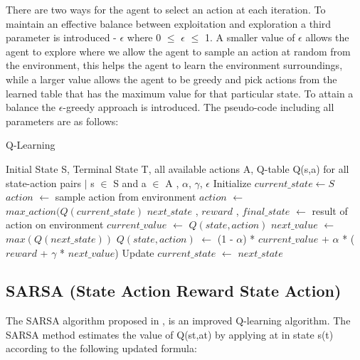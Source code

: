 \documentclass{svproc}
\begin{document}
There are two ways for the agent to select an action at each iteration. To maintain an effective balance between exploitation and exploration a third parameter is introduced - $\epsilon$ where 0 $\leq$  $\epsilon$ $\leq$ 1. A smaller value of $\epsilon$ allows the agent to explore where we allow the agent to sample an action at random from the environment, this helps the agent to learn the environment surroundings, while a larger value allows the agent to be greedy and pick actions from the learned table that has the maximum value for that particular state. 
To attain a balance the $\epsilon$-greedy approach is introduced. The pseudo-code including all parameters are as follows:

\begin{algorithm}
\caption{Q-Learning}
\begin{algorithmic}[1]
\REQUIRE Initial State S, Terminal State T, all available actions A, Q-table Q(s,a) for all state-action pairs $\mid$ s $\in$ S and a $\in$ A , $\alpha$, $\gamma$, $\epsilon$
\STATE Initialize $current\_state \leftarrow  S$
\REPEAT
{}
\STATE $action$ $\leftarrow$ sample action from environment
\ELSE
\STATE $action$ $\leftarrow$ $max\_action(Q(current\_state)$
\ENDIF
\STATE $next\_state$ , $reward$ , $final\_state$ $\leftarrow$ result of action on environment
\STATE $current\_value$ $\leftarrow$ $Q(state,action)$
\STATE $next\_value$ $\leftarrow$ $max(Q(next\_state))$
\STATE $Q(state,action)$ $\leftarrow$ (1 - $\alpha$) * $current\_value$ + $\alpha$ * ($reward$ + $\gamma$ * $next\_value$)
\STATE Update $current\_state$ $\leftarrow$ $next\_state$
\end{algorithmic}
\end{algorithm}

\subsection{SARSA (State Action Reward State Action)}
The SARSA algorithm proposed in \citep{sutton1996generalization,sutton1988learning}, is an improved Q-learning algorithm. The SARSA method estimates the value of Q(st,at) by applying at in state s(t) according to the following updated formula: \newline
\end{document}
